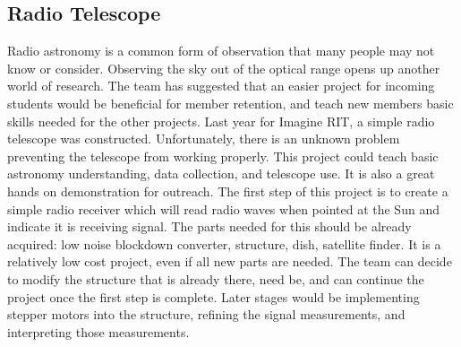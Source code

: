 \documentclass[conference]{IEEEtran} %
\begin{document}
\subsection{Radio Telescope}
\label{subsec:radio}
  Radio astronomy is a common form of observation that many people may not know or consider. Observing the sky out of the optical range opens up another world of research. The team has suggested that an easier project for incoming students would be beneficial for member retention, and teach new members basic skills needed for the other projects. Last year for Imagine RIT, a simple radio telescope was constructed. Unfortunately, there is an unknown problem preventing the telescope from working properly. This project could teach basic astronomy understanding, data collection, and telescope use. It is also a great hands on demonstration for outreach. The first step of this project is to create a simple radio receiver which will read radio waves when pointed at the Sun and indicate it is receiving signal. The parts needed for this should be already acquired: low noise blockdown converter, structure, dish, satellite finder. It is a relatively low cost project, even if all new parts are needed. The team can decide to modify the structure that is already there, need be, and can continue the project once the first step is complete. Later stages would be implementing stepper motors into the structure, refining the signal measurements, and interpreting those measurements.
  
\end{document}
